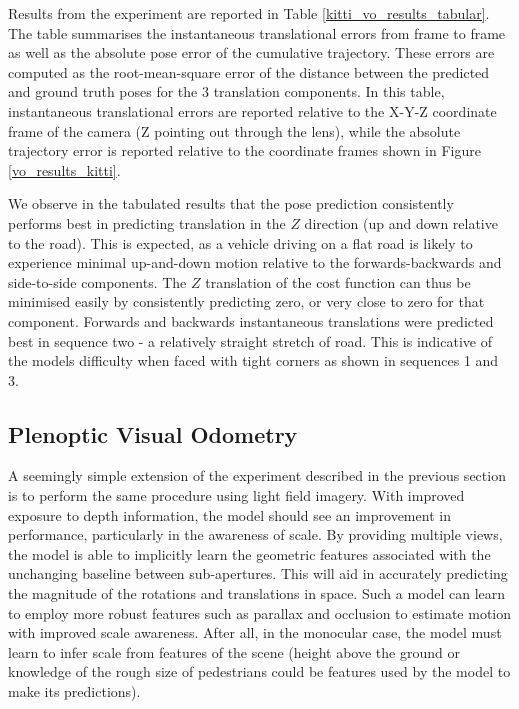 \documentclass[openany]{book}
\begin{document}
Results from the experiment are reported in Table \ref{kitti_vo_results_tabular}. The table summarises the instantaneous translational errors from frame to frame as well as the absolute pose error of the cumulative trajectory. These errors are computed as the root-mean-square error of the distance between the predicted and ground truth poses for the 3 translation components. In this table, instantaneous translational errors are reported relative to the X-Y-Z coordinate frame of the camera (Z pointing out through the lens), while the absolute trajectory error is reported relative to the coordinate frames shown in Figure \ref{vo_results_kitti}.







We observe in the tabulated results that the pose prediction consistently performs best in predicting translation in the $Z$ direction (up and down relative to the road). This is expected, as a vehicle driving on a flat road is likely to experience minimal up-and-down motion relative to the forwards-backwards and side-to-side components. The $Z$ translation of the cost function can thus be minimised easily by consistently predicting zero, or very close to zero for that component. Forwards and backwards instantaneous translations were predicted best in sequence two - a relatively straight stretch of road. This is indicative of the models difficulty when faced with tight corners as shown in sequences 1 and 3. 

\subsection{Plenoptic Visual Odometry}
A seemingly simple extension of the experiment described in the previous section is to perform the same procedure using light field imagery. With improved exposure to depth information, the model should see an improvement in performance, particularly in the awareness of scale. By providing multiple views, the model is able to implicitly learn the geometric features associated with the unchanging baseline between sub-apertures. This will aid in accurately predicting the magnitude of the rotations and translations in space. Such a model can learn to employ more robust features such as parallax and occlusion to estimate motion with improved scale awareness. After all, in the monocular case, the model must learn to infer scale from features of the scene (height above the ground or knowledge of the rough size of pedestrians could be features used by the model to make its predictions). 
\end{document}
